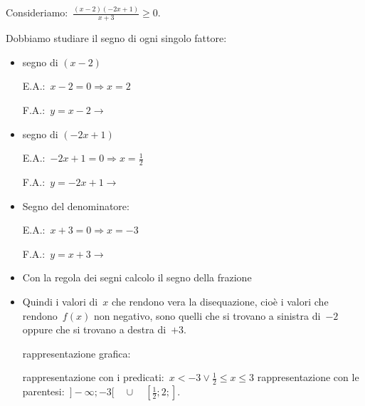  \begin{esempio}
Consideriamo:~$\frac{(x-2)(-2x+1)}{x+3} \ge 0$.

Dobbiamo studiare il segno di ogni singolo fattore:
\begin{itemize} [noitemsep]
 \item segno di $(x-2)$\\
 \begin{minipage}{.45\textwidth}
  E.A.:~$x-2=0 \Rightarrow x=2$
 \end{minipage}
 \begin{minipage}{.25\textwidth}
  F.A.:~$y=x-2 \rightarrow $
 \end{minipage}
 \begin{minipage}{.3\textwidth}
  
 \end{minipage}
 \item segno di $(-2x+1)$\\
 \begin{minipage}{.45\textwidth}
  E.A.:~$-2x+1=0 \Rightarrow x=\frac{1}{2}$
 \end{minipage}
 \begin{minipage}{.25\textwidth}
  F.A.:~$y=-2x+1 \rightarrow $
 \end{minipage}
 \begin{minipage}{.3\textwidth}
  
 \end{minipage}
 \item Segno del denominatore:\\
 \begin{minipage}{.45\textwidth}
  E.A.:~$x + 3=0 \Rightarrow x=-3$
 \end{minipage}
 \begin{minipage}{.25\textwidth}
  F.A.:~$y=x +3 \rightarrow $
 \end{minipage}
 \begin{minipage}{.3\textwidth}
  
 \end{minipage}
 \item Con la regola dei segni calcolo il segno della frazione 
  
 \item Quindi i valori di~$x$ che rendono vera la disequazione, cioè i valori
  che rendono~$f(x)$ non negativo, sono quelli 
  che si trovano a sinistra di~$-2$ oppure che si trovano a destra di~$+3$. 
 \subitem 
  \begin{minipage}{.35\textwidth}
   rappresentazione grafica: 
  \end{minipage}
  \begin{minipage}{.30\textwidth}
  \end{minipage}
 \subitem rappresentazione con i 
   predicati:~$x < -3 \lor \frac{1}{2} \le x \le 3$ 
 \subitem rappresentazione con le 
  parentesi:~$]-\infty; -3[ \quad \cup \quad [\frac{1}{2}; 2;]$. 
\end{itemize}
 \end{esempio}

